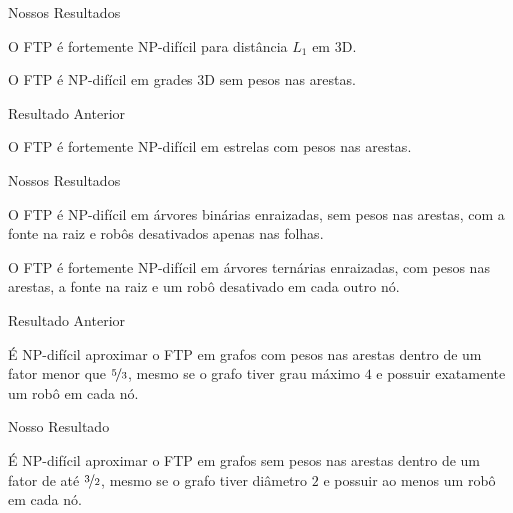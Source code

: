 \begin{frame}{Nossos Resultados}
  \begin{thm}
    O FTP é fortemente NP-difícil para distância $L_1$ em 3D.
  \end{thm}

  \pause
  \begin{cor}
    O FTP é NP-difícil em grades 3D sem pesos nas arestas.
  \end{cor}
\end{frame}

\begin{frame}{Resultado Anterior}
  \begin{thm}
    O FTP é fortemente NP-difícil em estrelas com pesos nas arestas.
  \end{thm}
\end{frame}

\begin{frame}{Nossos Resultados}
  \begin{cor}
    O FTP é NP-difícil em árvores binárias enraizadas, sem pesos nas arestas, com a fonte na raiz e robôs desativados apenas nas folhas.
  \end{cor}

  \pause
  \begin{cor}
    O FTP é fortemente NP-difícil em árvores ternárias enraizadas, com pesos nas arestas, a fonte na raiz e um robô desativado em cada outro nó.
  \end{cor}
\end{frame}

\begin{frame}{Resultado Anterior}
  \begin{thm}
    É NP-difícil aproximar o FTP em grafos com pesos nas arestas dentro de um fator menor que $\nicefrac{5}{3}$, mesmo se o grafo tiver grau máximo $4$ e possuir exatamente um robô em cada nó.
  \end{thm}
\end{frame}

\begin{frame}{Nosso Resultado}
  \begin{thm}
    É NP-difícil aproximar o FTP em grafos sem pesos nas arestas dentro de um fator de até $\nicefrac{3}{2}$, mesmo se o grafo tiver diâmetro $2$ e possuir ao menos um robô em cada nó.
  \end{thm}
\end{frame}

